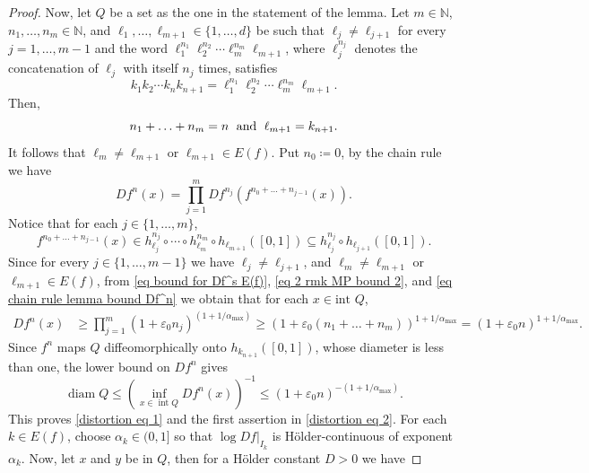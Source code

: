 \documentclass[12pt]{amsart}
\numberwithin{equation}{section} %
\numberwithin{figure}{section} %
\theoremstyle{plain}
\theoremstyle{definition}
\theoremstyle{remark}
\theoremstyle{citing}
\newcommand{\N}{\mathbb{N}}
\renewcommand{\=}{\coloneqq}
\begin{document}
\begin{proof}
    Now, let $Q$ be a set as the one in the statement of the lemma.
    Let $m\in\N$, $n_1,\ldots,n_m\in \N$, and $\ell_1,\ldots,\ell_{m+1}\in \{1,\ldots,d\}$ be such that $\ell_j \neq \ell_{j+1}$ for every $j=1,\ldots,m-1$ and the word $\ell_{1}^{n_1} \ell_{2}^{n_2}\cdots \ell_{m}^{n_m}\ell_{m+1}$,  where $\ell_{j}^{n_j}$ denotes the concatenation of $\ell_j$ with itself $n_j$ times, satisfies
    \begin{equation}
        k_1k_2\cdots k_{n} k_{n+1} = \ell_{1}^{n_1} \ell_{2}^{n_2}\cdots \ell_{m}^{n_m}\ell_{m+1}.
    \end{equation}
    Then,
    \begin{equation}
        n_1+\ldots + n_m =n \text{\; and \;} \ell_{m+1}= k_{n+1}.
    \end{equation}
    It follows that $\ell_m\neq \ell_{m+1}$ or $\ell_{m+1}\in E(f)$. Put $n_0\=0$, by the chain rule we have 
    \begin{equation}\label{eq chain rule lemma bound Df^n}
        Df^n(x) = \prod_{j=1}^m Df^{n_j}(f^{n_0+\ldots + n_{j-1}}(x)).
    \end{equation}
    Notice that for each $j\in \{1,\ldots,m\}$,
    \begin{equation*}
        f^{n_0+\dots + n_{j-1}}(x) \in h_{\ell_j}^{n_j}\circ\cdots\circ h_{\ell_m}^{n_m} \circ h_{{\ell_{m+1}}}([0,1]) \subseteq h_{\ell_j}^{n_j}\circ h_{\ell_{j+1}}([0,1]).
    \end{equation*}
    Since for every $j\in \{1,\ldots,m-1\}$ we have $\ell_j \neq \ell_{j+1}$, and $\ell_m\neq \ell_{m+1}$ or $\ell_{m+1}\in E(f)$, from \eqref{eq bound for Df^s E(f)}, \eqref{eq 2 rmk MP bound 2}, and \eqref{eq chain rule lemma bound Df^n} we obtain that for each $x\in \text{int }Q$,
   \begin{equation*}
       \begin{split}
           Df^{n}(x) &\geq \prod_{j=1}^m (1+\varepsilon_0 n_j)^{(1+1/\alpha_{\max} )}\geq (1+\varepsilon_0(n_1+\ldots+n_m))^{1+1/\alpha_{\max}}= (1+\varepsilon_0 n)^{1+1/\alpha_{\max}}.
       \end{split}
   \end{equation*}
   Since $f^n$ maps $Q$ diffeomorphically onto $h_{k_{n+1}}([0,1])$, whose diameter is less than one, the lower bound on $Df^n$ gives
\begin{equation*}
\operatorname{diam} Q \le \left(\inf_{x\in\operatorname{int} Q} Df^n(x)\right)^{-1} \le (1+\varepsilon_0 n)^{-(1+1/\alpha_{\max})}.
\end{equation*}
 This proves \eqref{distortion eq 1} and the first assertion in \eqref{distortion eq 2}. For each $k\in E(f)$, choose $\alpha_k\in (0,1]$ so that $\log Df|_{I_k}$ is Hölder-continuous of exponent $\alpha_k$. Now, let $x$ and $y$ be in $Q$, then for a Hölder constant $D>0$ we have

\end{proof}
\end{document}
